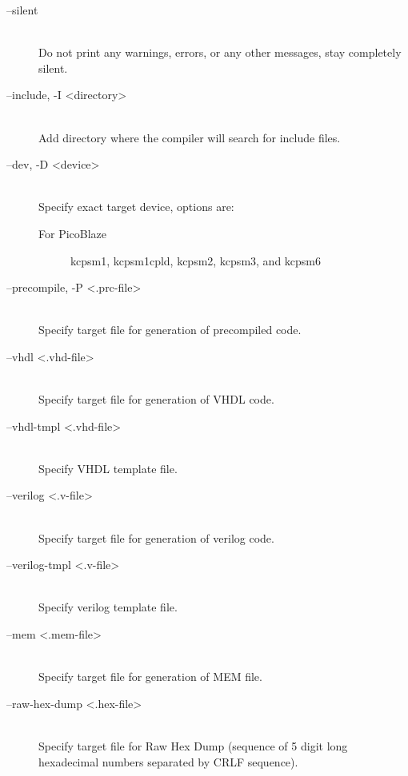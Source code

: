 \begin{description}
                \item[--silent]~\\
                    Do not print any warnings, errors, or any other messages, stay completely silent.

                \item[--include, -I <directory>]~\\
                    Add directory where the compiler will search for include files.

                \item[--dev, -D <device>]~\\
                    Specify exact target device, options are:
                    \begin{description}
                        \item[For PicoBlaze]
                            kcpsm1, kcpsm1cpld, kcpsm2, kcpsm3, and kcpsm6
                    \end{description}

                \item[--precompile, -P <.prc-file>]~\\
                    Specify target file for generation of precompiled code.

                \item[--vhdl <.vhd-file>]~\\
                    Specify target file for generation of VHDL code.

                \item[--vhdl-tmpl <.vhd-file>]~\\
                    Specify VHDL template file.

                \item[--verilog <.v-file>]~\\
                    Specify target file for generation of verilog code.

                \item[--verilog-tmpl <.v-file>]~\\
                    Specify verilog template file.

                \item[--mem <.mem-file>]~\\
                    Specify target file for generation of MEM file.

                \item[--raw-hex-dump <.hex-file>]~\\
                    Specify target file for Raw Hex Dump (sequence of 5 digit long hexadecimal numbers separated by CRLF sequence).
            \end{description}

